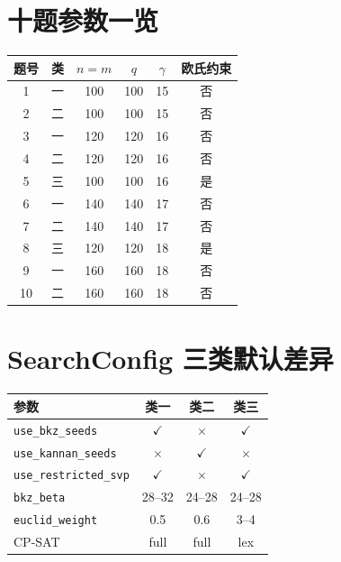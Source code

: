 \documentclass[12pt,a4paper]{ctexart}
\newcommand{\refzi}{\zihao{5}}
\begin{document}
\appendix
\section{十题参数一览}
\refzi
\begin{table}[htbp]
  \centering
  \small
  \begin{tabular}{cccccc}
    \toprule
    题号 & 类 & $n{=}m$ & $q$ & $\gamma$ & 欧氏约束 \\
    \midrule
    1 & 一 & 100 & 100 & 15 & 否 \\
    2 & 二 & 100 & 100 & 15 & 否 \\
    3 & 一 & 120 & 120 & 16 & 否 \\
    4 & 二 & 120 & 120 & 16 & 否 \\
    5 & 三 & 100 & 100 & 16 & 是 \\
    6 & 一 & 140 & 140 & 17 & 否 \\
    7 & 二 & 140 & 140 & 17 & 否 \\
    8 & 三 & 120 & 120 & 18 & 是 \\
    9 & 一 & 160 & 160 & 18 & 否 \\
    10 & 二 & 160 & 160 & 18 & 否 \\
    \bottomrule
  \end{tabular}
\end{table}

\section{SearchConfig 三类默认差异}
\refzi
\begin{table}[htbp]
  \centering
  \small
  \begin{tabular}{lccc}
    \toprule
    参数 & 类一 & 类二 & 类三 \\
    \midrule
    \texttt{use\_bkz\_seeds} & $\checkmark$ & $\times$ & $\checkmark$ \\
    \texttt{use\_kannan\_seeds} & $\times$ & $\checkmark$ & $\times$ \\
    \texttt{use\_restricted\_svp} & $\checkmark$ & $\times$ & $\checkmark$ \\
    \texttt{bkz\_beta} & 28--32 & 24--28 & 24--28 \\
    \texttt{euclid\_weight} & 0.5 & 0.6 & 3--4 \\
    CP-SAT & full & full & lex \\
    \bottomrule
  \end{tabular}
\end{table}
\end{document}

